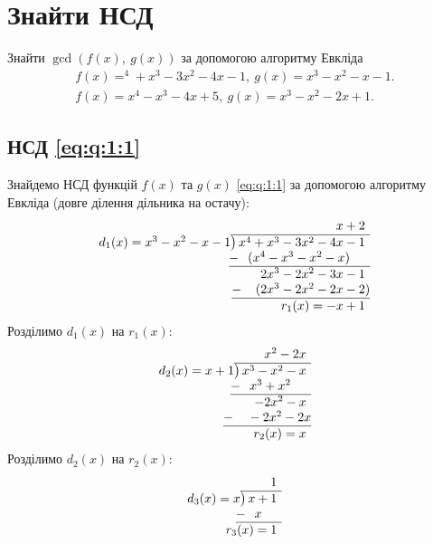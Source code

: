 \section{Знайти НСД}
Знайти \(\gcd(f(x),\ g(x))\) за допомогою алгоритму Евкліда
\begin{gather}
	f(x)=^4+x^3-3x^2-4x-1,\ g(x)=x^3-x^2-x-1.\label{eq:q:1:1}\\
	f(x)=x^4-x^3-4x+5,\ g(x)=x^3-x^2-2x+1.\label{eq:q:1:2}
\end{gather}
\subsection{НСД \eqref{eq:q:1:1}}
\solving
Знайдемо НСД функцій \(f(x)\) та \(g(x)\) \eqref{eq:q:1:1} за допомогою алгоритму Евкліда (довге ділення дільника на остачу):
\begin{gather}
	\begin{array}{r}
		x+2\phantom{)}   \\
		d_1(x)=x^3-x^2-x-1{\overline{\smash{\big)}\,x^4+x^3-3x^2-4x-1\phantom{)}}}\\
		\underline{-~\phantom{(}(x^4-x^3-x^2-x)\phantom{-b)}}\\
		2x^3-2x^2-3x-1\phantom{)}\\ 
		\underline{-~\phantom{()}(2x^3-2x^2-2x-2)}\\ 
		r_1(x)=-x+1\phantom{)}
	\end{array}
\end{gather}
Розділимо \(d_1(x)\) на \(r_1(x)\):
\begin{gather}
\begin{array}{r}
	x^2-2x\phantom{)}   \\
	d_2(x)=x+1{\overline{\smash{\big)}\,x^3-x^2-x\phantom{)}}}\\
	\underline{-~\phantom{(}x^3+x^2\phantom{-b)}}\\
	-2x^2-x\phantom{)}\\ 
	\underline{-~\phantom{()}-2x^2-2x}\\ 
	r_2(x)=x\phantom{)}
\end{array}
\end{gather}
Розділимо \(d_2(x)\) на \(r_2(x)\):
\begin{gather}
\begin{array}{r}
	1\phantom{)}   \\
	d_3(x)=x{\overline{\smash{\big)}\,x+1\phantom{)}}}\\
	\underline{-~\phantom{(}x\phantom{-b)}}\\
	r_3(x)=1\phantom{)}\\ 
\end{array}
\end{gather}
